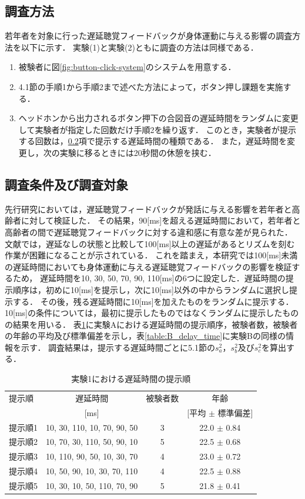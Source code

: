 \subsection{調査方法}
若年者を対象に行った遅延聴覚フィードバックが身体運動に与える影響の調査方法を以下に示す．
実験(1)と実験(2)ともに調査の方法は同様である．
\begin{enumerate}[leftmargin=*]
  \item 被験者に図\ref{fig:button-click-system}のシステムを用意する．
  \item 4.1節の手順1から手順2まで述べた方法によって，ボタン押し課題を実施する．
  \item ヘッドホンから出力されるボタン押下の合図音の遅延時間をランダムに変更して実験者が指定した回数だけ手順2を繰り返す．
  このとき，実験者が提示する回数は，\ref{subsec:Yobi-conditions}項で提示する遅延時間の種類である．
  また，遅延時間を変更し，次の実験に移るときには20秒間の休憩を挟む．
\end{enumerate}
\subsection{調査条件及び調査対象}
\label{subsec:Yobi-conditions}
先行研究\cite{kayama}においては，遅延聴覚フィードバックが発話に与える影響を若年者と高齢者に対して検証した．
その結果，90[ms]を超える遅延時間において，若年者と高齢者の間で遅延聴覚フィードバックに対する違和感に有意な差が見られた．
文献\cite{timing-music}では，遅延なしの状態と比較して100[ms]以上の遅延があるとリズムを刻む作業が困難になることが示されている．
これを踏まえ，本研究では100[ms]未満の遅延時間においても身体運動に与える遅延聴覚フィードバックの影響を検証するため，
遅延時間を10, 30, 50, 70, 90, 110[ms]の6つに設定した．遅延時間の提示順序は，初めに10[ms]を提示し，次に10[ms]以外の中からランダムに選択し提示する．
その後，残る遅延時間に10[ms]を加えたものをランダムに提示する．
10[ms]の条件については，最初に提示したものではなくランダムに提示したものの結果を用いる．
表\ref{table:A_delay_time}に実験Aにおける遅延時間の提示順序，被験者数，被験者の年齢の平均及び標準偏差を示し，表\ref{table:B_delay_time}に実験Bの同様の情報を示す．
調査結果は，提示する遅延時間ごとに5.1節の$s^2_{a}$，$s^2_{b}$及び$s^2_{c}$を算出する．
\begin{table}[btp]
  \caption{実験1における遅延時間の提示順}
  \label{table:A_delay_time}
  \centering
  \begin{tabular}{lccc}
    \hline
    提示順 & 遅延時間 & 被験者数 & 年齢\\
    　& [ms] & & [平均 $\pm$ 標準偏差]\\
    \hline \hline
    提示順1  & 10, 30, 110, 10, 70, 90, 50  & 3 & 22.0 $\pm$ 0.84\\
    提示順2  & 10, 70, 30, 110, 50, 90, 10  & 5 & 22.5 $\pm$ 0.68\\
    提示順3  & 10, 110, 90, 50, 10, 30, 70  & 4 & 23.0 $\pm$ 0.72\\
    提示順4  & 10, 50, 90, 10, 30, 70, 110  & 4 & 22.5 $\pm$ 0.88\\
    提示順5  & 10, 30, 10, 50, 110, 70, 90  & 5 & 21.8 $\pm$ 0.41
\\
    \hline
  \end{tabular}
\end{table}

